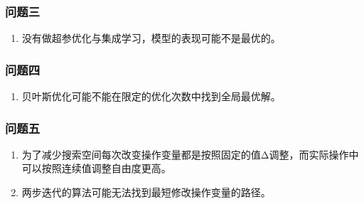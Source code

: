 \documentclass[bwprint]{gmcmthesis}
\begin{document}
\FloatBarrier
\subsubsection{问题三}
\begin{enumerate}[itemindent=20pt]
    \item 没有做超参优化与集成学习，模型的表现可能不是最优的。
\end{enumerate}


\FloatBarrier
\subsubsection{问题四}
\begin{enumerate}[itemindent=20pt]
    \item 贝叶斯优化可能不能在限定的优化次数中找到全局最优解。
\end{enumerate}

\FloatBarrier
\subsubsection{问题五}

\begin{enumerate}[itemindent=20pt]
    \item 为了减少搜索空间每次改变操作变量都是按照固定的值Δ调整，而实际操作中可以按照连续值调整自由度更高。
    \item 两步迭代的算法可能无法找到最短修改操作变量的路径。
\end{enumerate}





\newpage








\end{document}
